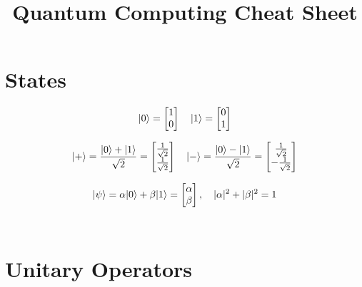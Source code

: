 \documentclass[12pt,a4paper]{article}
\title{Quantum Computing Cheat Sheet}
\date{}
\begin{document}
\maketitle

\section{States}

\begin{equation*}
{\left\vert{0}\right\rangle} = \begin{bmatrix} 1 \\ 0 \end{bmatrix}
\quad
{\left\vert{1}\right\rangle} = \begin{bmatrix} 0 \\ 1 \end{bmatrix}
\end{equation*}

\begin{equation*}
{\left\vert{+}\right\rangle} = \frac{{\left\vert{0}\right\rangle} + {\left\vert{1}\right\rangle}}{\sqrt{2}} 
= \begin{bmatrix} \frac{1}{\sqrt{2}} \\ \frac{1}{\sqrt{2}} \end{bmatrix}
\quad
{\left\vert{-}\right\rangle} = \frac{{\left\vert{0}\right\rangle} - {\left\vert{1}\right\rangle}}{\sqrt{2}}
= \begin{bmatrix} \frac{1}{\sqrt{2}} \\ -\frac{1}{\sqrt{2}} \end{bmatrix}
\end{equation*}

\begin{equation*}
{\left\vert{\psi}\right\rangle} = \alpha {\left\vert{0}\right\rangle} + \beta {\left\vert{1}\right\rangle} = \begin{bmatrix} \alpha \\ \beta \end{bmatrix} ,
\quad
|\alpha|^2 + |\beta|^2 = 1
\end{equation*} \\

\section{Unitary Operators}

\begin{tabular}{r@{=}l}
\end{tabular}
\end{document}
